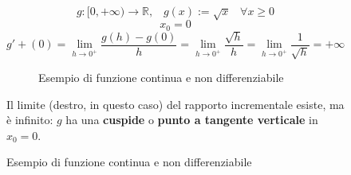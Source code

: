 \documentclass[a4paper]{article}
\theoremstyle{break}
\theoremstyle{break}
\theoremstyle{break}
\theoremstyle{break}
\begin{document}
\begin{figure}[H]
  \begin{example}
    \[
      g: [0,+\infty) \to \mathbb{R},\;\;\; g(x):= \sqrt{x}\;\;\; \forall x \ge 0
    \]
    \[
      x_0=0
    \]
    \[
      g'+(0)= \lim_{h \to 0^+} \frac{g(h)-g(0)}{h} = \lim_{h \to 0^+} \frac{\sqrt{h}}{h} = \lim_{h \to 0^+} \frac{1}{\sqrt{h} }  = +\infty
    \]
    \begin{figure}[H]
      \begin{center}
      \end{center}
      \caption{Esempio di funzione continua e non differenziabile}
    \end{figure}

    Il limite (destro, in questo caso) del rapporto incrementale esiste, ma è infinito: \( g \)
    ha una \textbf{cuspide} o \textbf{punto a tangente verticale} in \( x_0=0 \).
  \end{example}
\end{figure}
\end{document}
